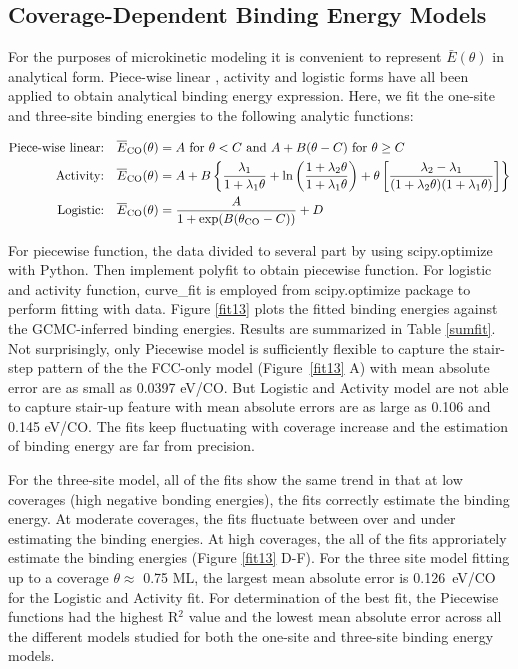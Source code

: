 \documentclass[11pt]{article}
\begin{document}
\subsection{Coverage-Dependent Binding Energy Models}\label{co-model}

For the purposes of microkinetic modeling it is convenient to represent $\bar{E}(\theta)$ in analytical form.  Piece-wise linear \cite{Grabow2010}, activity \cite{Bajpai2020} and logistic\cite{Grabow2008} forms have all been applied to obtain analytical binding energy expression. Here, we fit the one-site and three-site binding energies to the following analytic functions:

\begin{align*}
\text{Piece-wise linear:} & \quad \overline{E}_{\ce{CO}}(\theta) = A \text{ for }\theta<C\text{  and }A+B(\theta-C)\text{ for } \theta\geq C\\
\text{Activity:} & \quad \overline{E}_{\ce{CO}}(\theta)  =A+B\left\{\frac{\lambda_{1}}{1+\lambda_{1}\theta}+\ln\left(\frac{1+\lambda_{2}\theta}{1+\lambda_{1}\theta}\right)+\theta\left[\frac{\lambda_{2}-\lambda_{1}}{(1+\lambda_{2}\theta)(1+\lambda_{1}\theta)}\right]\right\}\\
\text{Logistic:} & \quad \overline{E}_{\ce{CO}}(\theta)  =\frac{A}{1+ \exp (B(\theta_{\text{CO}}- C ))}+D\\
\end{align*}

\noindent
For piecewise function, the data divided to several part by using scipy.optimize with Python. Then implement polyfit to obtain piecewise function. For logistic and activity function, curve\_fit is employed from scipy.optimize package to perform fitting with data. Figure \ref{fit13} plots the fitted binding energies against the GCMC-inferred binding energies. Results are summarized in Table \ref{sumfit}. Not surprisingly, only Piecewise model is sufficiently flexible to capture the stair-step pattern of the the FCC-only model (Figure~\ref{fit13} A) with mean absolute error are as small as 0.0397 eV/CO. But Logistic and Activity model are not able to capture stair-up feature with mean absolute errors are as large as 0.106 and 0.145 eV/CO. The fits keep fluctuating with coverage increase and the estimation of binding energy are far from precision. \par
For the three-site model, all of the fits show the same trend in that at low coverages (high negative bonding energies), the fits correctly estimate the binding energy. At moderate coverages, the fits fluctuate between over and under estimating the binding energies. At high coverages, the all of the fits approriately estimate the binding energies (Figure \ref{fit13} D-F). For the three site model fitting up to a coverage $\theta\approx$ 0.75 ML, the largest mean absolute error is 0.126~eV/CO for the Logistic and Activity fit. For determination of the best fit, the Piecewise functions had the highest R$^2$ value and the lowest mean absolute error across all the different models studied for both the one-site and three-site binding energy models.
\end{document}
